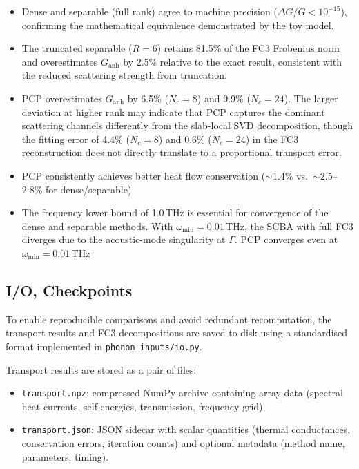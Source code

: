 \begin{itemize}
  \item Dense and separable (full rank) agree to machine precision
    ($\Delta G / G < 10^{-15}$), confirming the mathematical
    equivalence demonstrated by the toy model.

  \item The truncated separable ($R = 6$) retains 81.5\% of the FC3
    Frobenius norm and overestimates $G_\mathrm{anh}$ by 2.5\%
    relative to the exact result, consistent with the reduced
    scattering strength from truncation.

  \item PCP overestimates $G_\mathrm{anh}$ by 6.5\% ($N_c = 8$) and
    9.9\% ($N_c = 24$).  The larger deviation at higher rank may
    indicate that PCP captures the dominant scattering channels
    differently from the slab-local SVD decomposition, though the
    fitting error of 4.4\% ($N_c = 8$) and 0.6\% ($N_c = 24$) in the
    FC3 reconstruction does not directly translate to a proportional
    transport error.

  \item PCP consistently achieves better heat flow conservation
    ($\sim 1.4\%$ vs.\ $\sim 2.5$--$2.8\%$ for dense/separable)

  \item The frequency lower bound of 1.0\,THz is essential for
    convergence of the dense and separable methods.  With
    $\omega_\mathrm{min} = 0.01$\,THz, the SCBA with full FC3 diverges due to
    the acoustic-mode singularity at $\Gamma$.  PCP converges even at
    $\omega_\mathrm{min} = 0.01$\,THz
\end{itemize}


\subsection{I/O, Checkpoints}
\label{sub:io}

To enable reproducible comparisons and avoid redundant recomputation,
the transport results and FC3 decompositions are saved to disk using
a standardised format implemented in \texttt{phonon\_inputs/io.py}.

Transport results are stored as a pair of files:
\begin{itemize}
  \item \texttt{transport.npz}: compressed NumPy archive containing
    array data (spectral heat currents, self-energies, transmission,
    frequency grid),
  \item \texttt{transport.json}: JSON sidecar with scalar quantities
    (thermal conductances, conservation errors, iteration counts) and
    optional metadata (method name, parameters, timing).
\end{itemize}

